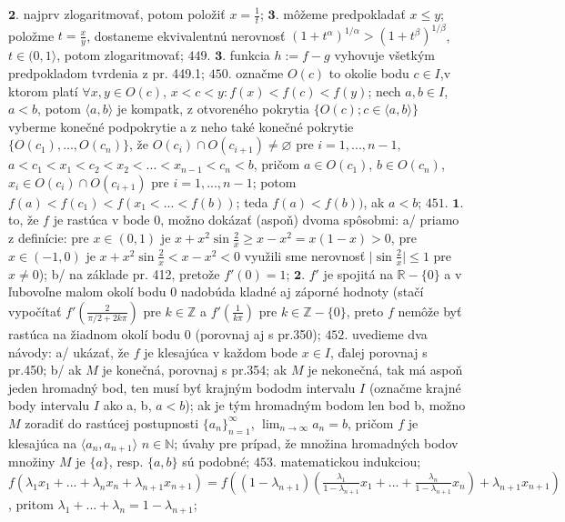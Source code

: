 $\boldsymbol{2.}$ najprv zlogaritmovať, potom položiť $x=\frac{1}{t}$;
$\boldsymbol{3.}$ môžeme predpokladať $x\leq y$; položme $t=\frac{x}{y}$, dostaneme ekvivalentnú nerovnosť $(1+t^{\alpha})^{1/\alpha}>(1+t^{\beta})^{1/\beta}$, $t\in (0,1 \rangle$, potom zlogaritmovať;
$\boxed{449.}$ $\boldsymbol{3.}$ funkcia $h:=f-g$ vyhovuje všetkým predpokladom tvrdenia z pr. 449.1;
$\boxed{450.}$ označme $O(c)$ to okolie bodu $c\in I$,v ktorom platí $\forall x,y \in O(c)$, $x<c<y:f(x)<f(c)<f(y)$; nech $a,b\in I$, $a<b$, potom $\langle a,b \rangle$ je kompatk, z otvoreného pokrytia $\lbrace O(c);c\in \langle a,b \rangle \rbrace $ vyberme konečné podpokrytie a z neho také konečné pokrytie $\lbrace O(c_{1}),...,O(c_{n})\rbrace$, že $O(c_{i})\cap O(c_{i+1})\ne \varnothing$ pre $i=1,...,n-1,$ $a<c_{1}<x_{1}<c_{2}<x_{2}<...<x_{n-1}<c_{n}<b$, pričom  $a\in O(c_{1})$, $b\in O(c_{n})$, $x_{i}\in O(c_{i})\cap O(c_{i+1})$ pre $i=1,...,n-1$; potom $f(a)<f(c_{1})<f(x_{1}<...<f(b))$; teda $f(a)<f(b))$, ak $a<b$;
$\boxed{451.}$ $\boldsymbol{1.}$ to, že $f$ je rastúca v bode 0, možno dokázať (aspoň) dvoma spôsobmi: a/ priamo z definície: pre $x\in (0,1)$ je $x+x^{2} \sin \frac{2}{x}\geq x-x^{2} = x(1-x)>0$, pre $x\in (-1,0)$ je $x+x^{2} \sin \frac{2}{x}< x-x^{2}<0$ využili sme nerovnosť $\vert \sin \frac{2}{x}\vert \leq 1$ pre $x\ne 0$); b/ na základe pr. 412, pretože $f'(0)=1$;
$\boldsymbol{2.}$ $f'$ je spojitá na $\mathbb{R}- \lbrace 0 \rbrace$ a v ľubovoľne malom okolí bodu 0 nadobúda kladné aj záporné hodnoty (stačí vypočítať $f'(\frac{2}{\pi/2+2k\pi})$ pre $k \in \mathbb{Z}$ a $f'(\frac{1}{k\pi})$ pre $k \in \mathbb{Z} - \lbrace 0 \rbrace $, preto $f$ nemôže byť rastúca na žiadnom okolí bodu 0 (porovnaj aj s pr.350);
$\boxed{452.}$ uvedieme dva návody: a/ ukázať, že $f$ je klesajúca v každom bode $x\in I$, ďalej porovnaj s pr.450; b/ ak $M$ je konečná, porovnaj s pr.354;  ak $M$ je nekonečná, tak má aspoň jeden hromadný bod, ten musí byť krajným bododm intervalu $I$ (označme krajné body intervalu $I$ ako a, b, $a<b$); ak je tým hromadným bodom len bod b, možno  $M$ zoradiť do rastúcej postupnosti  $\lbrace a_{n} \rbrace _{n=1}^{\infty}$, $\lim_{n \to \infty}a_n =b$, pričom $f$ je klesajúca na $\langle a_{n}, a_{n+1} \rangle$  $n\in \mathbb{N}$; úvahy pre prípad, že množina hromadných bodov množiny $M$ je $\lbrace a \rbrace$, resp. $\lbrace a,b \rbrace$ sú podobné;
$\boxed{453.}$ matematickou indukciou; $f(\lambda _{1}x_{1}+...+  \lambda _{n}x_{n}+  \lambda _{n+1}x_{n+1})=f((1-\lambda _{n+1})(\frac{\lambda  _{1}}{1-\lambda _{n+1}}x_{1}+...+\frac{\lambda _{n}}{1-\lambda _{n+1}}x_{n})+\lambda _{n+1}x_{n+1})$, pritom  $\lambda _{1}+...+\lambda _{n}=1-\lambda _{n+1}$;

